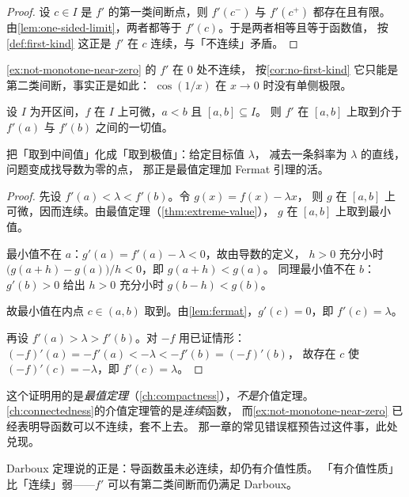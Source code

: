 \begin{proof}
  设 \(c \in I\) 是 \(f'\) 的第一类间断点，则 \(f'(c^{-})\) 与 \(f'(c^{+})\) 都存在且有限。
  由\cref{lem:one-sided-limit}，两者都等于 \(f'(c)\)。于是两者相等且等于函数值，
  按\cref{def:first-kind} 这正是 \(f'\) 在 \(c\) 连续，与「不连续」矛盾。
\end{proof}

\begin{remark}
  \cref{ex:not-monotone-near-zero} 的 \(f'\) 在 \(0\) 处不连续，
  按\cref{cor:no-first-kind} 它只能是第二类间断，事实正是如此：
  \(\cos(1/x)\) 在 \(x \to 0\) 时没有单侧极限。
\end{remark}

\begin{theorem}[Darboux]
  \label{thm:darboux}
  设 \(I\) 为开区间，\(f\) 在 \(I\) 上可微，\(a<b\) 且 \([a,b] \subseteq I\)。
  则 \(f'\) 在 \([a,b]\) 上取到介于 \(f'(a)\) 与 \(f'(b)\) 之间的一切值。
\end{theorem}

\begin{strategy}
  把「取到中间值」化成「取到极值」：给定目标值 \(\lambda\)，
  减去一条斜率为 \(\lambda\) 的直线，问题变成找导数为零的点，
  那正是最值定理加 Fermat 引理的活。
\end{strategy}

\begin{proof}
  先设 \(f'(a) < \lambda < f'(b)\)。令 \(g(x) = f(x)-\lambda x\)，
  则 \(g\) 在 \([a,b]\) 上可微，因而连续。由最值定理（\cref{thm:extreme-value}），
  \(g\) 在 \([a,b]\) 上取到最小值。

  最小值不在 \(a\)：\(g'(a) = f'(a)-\lambda < 0\)，故由导数的定义，
  \(h>0\) 充分小时 \(\bigl(g(a+h)-g(a)\bigr)/h < 0\)，即 \(g(a+h)<g(a)\)。
  同理最小值不在 \(b\)：\(g'(b)>0\) 给出 \(h>0\) 充分小时 \(g(b-h)<g(b)\)。

  故最小值在内点 \(c \in (a,b)\) 取到。由\cref{lem:fermat}，\(g'(c)=0\)，即 \(f'(c)=\lambda\)。

  再设 \(f'(a) > \lambda > f'(b)\)。对 \(-f\) 用已证情形：
  \((-f)'(a) = -f'(a) < -\lambda < -f'(b) = (-f)'(b)\)，
  故存在 \(c\) 使 \((-f)'(c) = -\lambda\)，即 \(f'(c)=\lambda\)。
\end{proof}

\begin{pitfall}
  这个证明用的是\emph{最值定理}（\cref{ch:compactness}），\emph{不是}介值定理。
  \cref{ch:connectedness}的介值定理管的是\emph{连续}函数，
  而\cref{ex:not-monotone-near-zero} 已经表明导函数可以不连续，套不上去。
  那一章的常见错误框预告过这件事，此处兑现。

  Darboux 定理说的正是：导函数虽未必连续，却仍有介值性质。
  「有介值性质」比「连续」弱——\(f'\) 可以有第二类间断而仍满足 Darboux。
\end{pitfall}

